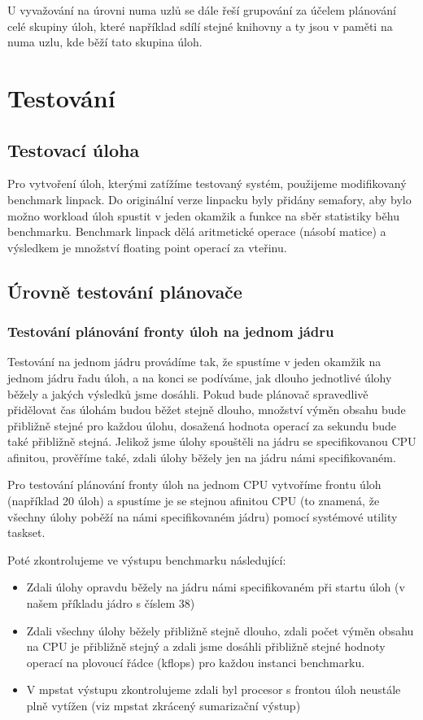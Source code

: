 \documentclass[a4paper,12pt]{article}
\begin{document}
U vyvažování na úrovni numa uzlů se dále řeší grupování za účelem plánování celé skupiny úloh, které například sdílí stejné knihovny a ty jsou v paměti na numa uzlu, kde běží tato skupina úloh. 


\section{Testování}

\subsection{Testovací úloha}
Pro vytvoření úloh, kterými zatížíme testovaný systém, použijeme modifikovaný benchmark linpack. Do originální verze linpacku byly přidány semafory, aby bylo možno workload úloh spustit v jeden okamžik a funkce na sběr statistiky běhu benchmarku. Benchmark linpack dělá aritmetické operace (násobí matice) a výsledkem je množství floating point operací za vteřinu. 

\subsection{Úrovně testování plánovače}

\subsubsection{Testování plánování fronty úloh na jednom jádru}

Testování na jednom jádru provádíme tak, že spustíme v jeden okamžik na jednom jádru řadu úloh, a na konci se podíváme, jak dlouho jednotlivé úlohy běžely a jakých výsledků jsme dosáhli. Pokud bude plánovač spravedlivě přidělovat čas úlohám budou běžet stejně dlouho, množství výměn obsahu bude přibližně stejné pro každou úlohu, dosažená hodnota operací za sekundu bude také přibližně stejná. Jelikož jsme úlohy spouštěli na jádru se specifikovanou CPU afinitou, prověříme také, zdali úlohy běžely jen na jádru námi specifikovaném.

Pro testování plánování fronty úloh na jednom CPU vytvoříme frontu úloh (například 20 úloh) a spustíme je se stejnou afinitou CPU (to znamená, že všechny úlohy poběží na námi specifikovaném jádru) pomocí systémové utility taskset.

Poté zkontrolujeme ve výstupu benchmarku následující:
\begin{itemize}
\item Zdali úlohy opravdu běžely na jádru námi specifikovaném při startu úloh (v našem příkladu jádro s číslem 38)
\item Zdali všechny úlohy běžely přibližně stejně dlouho, zdali počet výměn obsahu na CPU je přibližně stejný  a zdali jsme dosáhli přibližně stejné hodnoty operací na plovoucí řádce (kflops) pro každou instanci benchmarku.
\item V mpstat výstupu zkontrolujeme zdali byl procesor s frontou úloh neustále plně vytížen (viz mpstat zkrácený sumarizační výstup)\\
\end{itemize}
\end{document}
